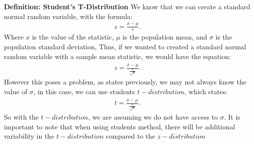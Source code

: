 \documentclass{report}
\begin{document}
    \bigbreak \noindent 
    \begin{mdframed}
      \textbf{Definition: Student's T-Distribution}
      \bigbreak \noindent 
      We know that we can create a standard normal random variable, with the formula:
      \begin{align*}
          z = \frac{x - \mu}{s}
      .\end{align*}
      \bigbreak \noindent 
      Where $x $ is the value of the statistic, $\mu $ is the population mean, and $\sigma$ is the population standard deviation, Thus, if we wanted to created a standard normal random variable with a sample mean statistic, we would have the equation:
      \begin{align*}
          z = \frac{\overline{x} - \mu}{\frac{\sigma}{\sqrt{n}}}
      .\end{align*}
      \bigbreak \noindent 
      However this poses a problem, as states previously, we may not always know the value of $\sigma$, in this case, we can use students $t-distribution$, which states:
      \begin{align*}
           t = \frac{\overline{x} - \mu}{\frac{s}{\sqrt{n}}}
      .\end{align*}
      \bigbreak \noindent 
      So with the $t-distribution $, we are assuming we do not have access to $\sigma $.
      \bigbreak \noindent 
      It is important to note that when using students method, there will be additional variability in the $t-distribution$ compared to the $z-distribution $ 
    \end{mdframed}
    \bigbreak \noindent 
\end{document}
